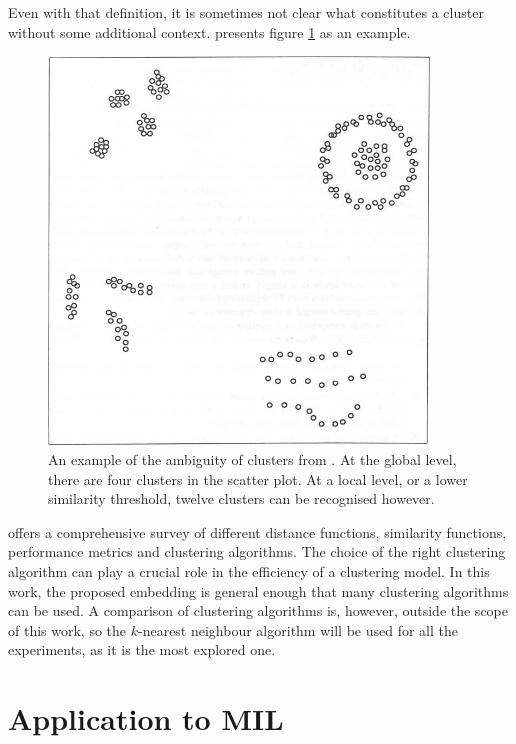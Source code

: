 Even with that definition, it is sometimes not clear what constitutes a cluster without some additional context. \cite{jain_algorithms_1988} presents figure \ref{fig:cluster-ambiguity} as an example.

\begin{figure}[h]
	\centering
	\includegraphics[width=0.9\textwidth]{images/cluster-ambiguity.png}
	\caption{An example of the ambiguity of clusters from \cite{jain_algorithms_1988}. At the global level, there are four clusters in the scatter plot. At a local level, or a lower similarity threshold, twelve clusters can be recognised however.}\label{fig:cluster-ambiguity}
\end{figure}

\cite{xu_comprehensive_2015} offers a comprehensive survey of different distance functions, similarity functions, performance metrics and clustering algorithms. The choice of the right clustering algorithm can play a crucial role in the efficiency of a clustering model. In this work, the proposed embedding is general enough that many clustering algorithms can be used. A comparison of clustering algorithms is, however, outside the scope of this work, so the \( k \)-nearest neighbour algorithm will be used for all the experiments, as it is the most explored one.

\section{Application to MIL}\label{sec:mil-clustering}

